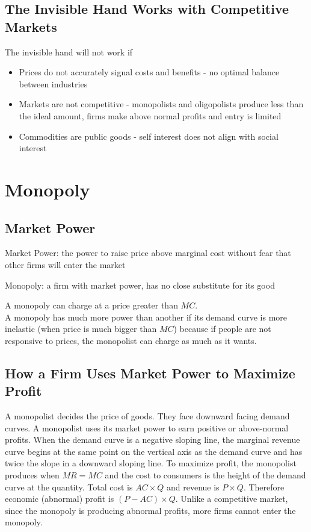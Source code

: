 \documentclass[12pt]{article}
\begin{document}
\subsection{The Invisible Hand Works with Competitive Markets}
The invisible hand will not work if \begin{itemize} 
\item Prices do not accurately signal costs and benefits - no optimal balance between industries 
\item Markets are not competitive - monopolists and oligopolists produce less than the ideal amount, firms make above normal profits and entry is limited 
\item Commodities are public goods - self interest does not align with social interest \end{itemize}


\section{Monopoly}
\subsection{Market Power}
\begin{definition} Market Power: the power to raise price above marginal cost without fear that other firms will enter the market \end{definition}
\begin{definition} Monopoly: a firm with market power, has no close substitute for its good \end{definition} 
A monopoly can charge at a price greater than $MC$. \\ 
A monopoly has much more power than another if its demand curve is more inelastic (when price is much bigger than $MC$) because if people are not responsive to prices, the monopolist can charge as much as it wants. 

\subsection{How a Firm Uses Market Power to Maximize Profit}
A monopolist decides the price of goods. They face downward facing demand curves. 
A monopolist uses its market power to earn positive or above-normal profits. When the demand curve is a negative sloping line, the marginal revenue curve begins at the same point on the vertical axis as the demand curve and has twice the slope in a downward sloping line. To maximize profit, the monopolist produces when $MR = MC$ and the cost to consumers is the height of the demand curve at the quantity. Total cost is $AC \times Q$ and revenue is $P \times Q$. Therefore economic (abnormal) profit is $(P - AC) \times Q$. Unlike a competitive market, since the monopoly is producing abnormal profits, more firms cannot enter the monopoly. 
\end{document}
